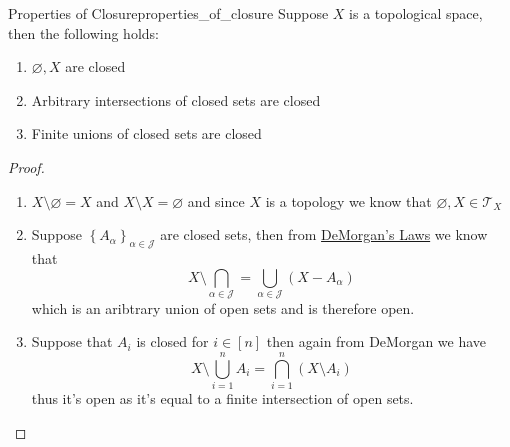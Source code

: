 \begin{proposition}{Properties of Closure}{properties_of_closure}
Suppose \( X \) is a topological space, then the following holds:
\begin{enumerate}
    \item \( \varnothing , X \) are closed
    \item Arbitrary intersections of closed sets are closed
    \item Finite unions of closed sets are closed
\end{enumerate}
\end{proposition}
\begin{proof}
    \begin{enumerate}
        \item \( X \setminus \varnothing = X \) and \( X \setminus X =
        \varnothing  \) and since \( X \) is a topology we know that \(
        \varnothing , X \in  \mathcal{ T }   _{ X }  \) 
        \item Suppose \( \left\{ A _{ \alpha  }  \right\} _{ \alpha \in
        \mathcal{ J }   }  \) are closed sets, then from
        \hyperref[theorem:demorgan's_laws]{DeMorgan's Laws} we know that 
        \[
        X \setminus \bigcap _{ \alpha \in \mathcal{ J }   } = \bigcup _{ \alpha
        \in \mathcal{ J }  } \left( X -  A _{ \alpha  }  \right) 
        \]
        which is an aribtrary union of open sets and is therefore open.
        \item Suppose that \( A _{ i }  \) is closed for \( i \in  \left[ n
        \right] \) then again from DeMorgan we have
        \[
        X \setminus  \bigcup _{ i = 1 } ^{ n } A _{ i } = \bigcap _{ i = 1 }^{ n
        } \left( X \setminus A _{ i }  \right) 
        \]
        thus it's open as it's equal to a finite intersection of open sets.
    \end{enumerate}
\end{proof}

